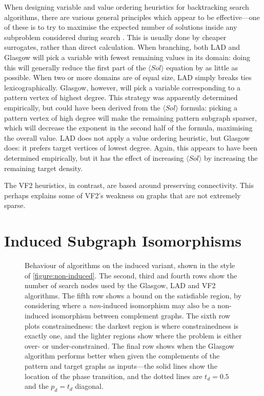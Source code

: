 \documentclass[letterpaper]{article}
\begin{document}
When designing variable and value ordering heuristics for backtracking search algorithms, there are
various general principles which appear to be effective---one of these is to try to maximise the
expected number of solutions inside any subproblem considered during search \citep{Gent:1996:EN}.
This is usually done by cheaper surrogates, rather than direct calculation. When branching, both LAD
and Glasgow will pick a variable with fewest remaining values in its domain: doing this will
generally reduce the first part of the $\langle Sol \rangle$ equation by as little as possible. When
two or more domains are of equal size, LAD simply breaks ties lexicographically. Glasgow, however, will
pick a variable corresponding to a pattern vertex of highest degree. This strategy was apparently
determined empirically, but could have been derived from the $\langle Sol \rangle$ formula: picking
a pattern vertex of high degree will make the remaining pattern subgraph sparser, which will
decrease the exponent in the second half of the formula, maximising the overall value. LAD does not
apply a value ordering heuristic, but Glasgow does: it prefers target vertices of lowest degree.
Again, this appears to have been determined empirically, but it has the effect of increasing
$\langle Sol \rangle$ by increasing the remaining target density.

The VF2 heuristics, in contrast, are based around preserving connectivity. This perhaps explains
some of VF2's weakness on graphs that are not extremely sparse.

\section{Induced Subgraph Isomorphisms}

\begin{figure*}[p]
    
    \caption{Behaviour of algorithms on the induced variant, shown in the style
    of \cref{figure:non-induced}. The second, third and fourth rows show the number of search nodes used by the
    Glasgow, LAD and VF2 algorithms. The fifth row shows a bound on the satisfiable region, by
    considering where a \emph{non-}induced isomorphism may also be a non-induced isomorphism between
    complement graphs. The sixth row plots constrainedness: the darkest region is where
    constrainedness is exactly one, and the lighter regions show where the problem is either over-
    or under-constrained. The final row shows when the Glasgow algorithm performs better when given
    the complements of the pattern and target graphs as inputs---the solid lines show the location
of the phase transition, and the dotted lines are $t_d=0.5$ and the $p_d=t_d$ diagonal.}\label{figure:induced}
\end{figure*}
\end{document}
